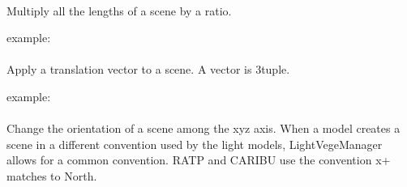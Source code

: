 \documentclass[letterpaper,10pt,english]{sphinxmanual}
\begin{document}
\paragraph{}
\label{\detokenize{inputs:rescale}}
\sphinxAtStartPar
Multiply all the lengths of a scene by a ratio.

\sphinxAtStartPar
example:

\begin{sphinxVerbatim}[commandchars=\\\{\}]
\PYG{p}{[}\PYG{p}{]}    
                                
\end{sphinxVerbatim}


\paragraph{}
\label{\detokenize{inputs:translate}}
\sphinxAtStartPar
Apply a translation vector to a scene. A vector is 3\sphinxhyphen{}tuple.

\sphinxAtStartPar
example:

\begin{sphinxVerbatim}[commandchars=\\\{\}]
\PYG{p}{[}\PYG{p}{]}      
                                    
\end{sphinxVerbatim}


\paragraph{}
\label{\detokenize{inputs:xyz-orientation}}
\sphinxAtStartPar
Change the orientation of a scene among the xyz axis.
When a model creates a scene in a different convention used by the light models, LightVegeManager allows for a common convention.
RATP and CARIBU use the convention x+ matches to North.
\end{document}
